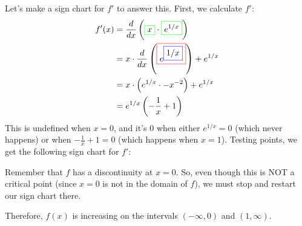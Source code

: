 \documentclass{article}
\begin{document}
\begin{enumerate}
\begin{enumerate}
    \begin{solution}
      Let's make a sign chart for $f'$ to answer this.  First, we
      calculate $f'$:
      \begin{align*}
        f'(x) = {} & \frac{d}{dx}
        \left(\fcolorbox{green}{white}{$\displaystyle  x$}\cdot
          \fcolorbox{green}{white}{$\displaystyle  e^ { 1/x } $}\right) \\
        = {} & x\cdot \frac{d}{dx} \left(\fcolorbox{red}{white}{$\displaystyle e^ { \fcolorbox{blue}{white}{$\displaystyle 1/x $}} $}\right)+ e^ { 1/x } \\
        = {} & x\cdot \left(e^ { 1/x } \cdot -x^ { -2} \right)+ e^ { 1/x }
        \\
        = {} & e^{1/x} \left( - \frac{1}{x} + 1 \right)
      \end{align*}
      This is undefined when $x = 0$, and it's 0 when either $e^{1/x} = 0$
      (which never happens) or when $- \frac{1}{x} + 1 = 0$ (which happens
      when $x = 1$).  Testing points, we get the following sign chart for
      $f'$:
      \begin{center}
      \end{center}
      Remember that $f$ has a discontinuity at $x=0$. So, even though this is NOT a critical point (since $x=0$ is not in the domain of $f$), we must stop and
      restart our sign chart there.

Therefore, $f(x)$ is increasing on the intervals $\boxed{(-\infty,0)}$ and $\boxed{(1, \infty)}$.
    \end{solution}


\end{enumerate}
\end{enumerate}
\end{document}
